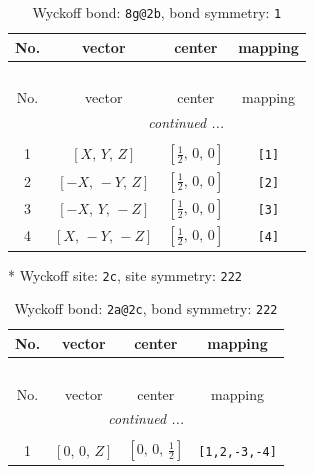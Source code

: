 \documentclass[fleqn,8pt]{jsarticle}
\begin{document}
\begin{longtable}{cccc}
\caption{Wyckoff bond: {\tt 8g@2b}, bond symmetry: {\tt 1}}
 \\
 \hline \hline
No. & vector & center & mapping \\ \hline \endfirsthead

\multicolumn{3}{l}{\tablename\ \thetable{}} \\
 \hline \hline
No. & vector & center & mapping \\ \hline \endhead

 \hline \hline
\multicolumn{3}{r}{\footnotesize\it continued ...} \\ \endfoot

 \hline \hline
\multicolumn{3}{r}{} \\ \endlastfoot

1 & $\left[ X,\, Y,\, Z \right]$ & $\left[ \frac{1}{2},\, 0,\, 0 \right]$ & {\tt [1]} \\ \hline
2 & $\left[ - X,\, - Y,\, Z \right]$ & $\left[ \frac{1}{2},\, 0,\, 0 \right]$ & {\tt [2]} \\ \hline
3 & $\left[ - X,\, Y,\, - Z \right]$ & $\left[ \frac{1}{2},\, 0,\, 0 \right]$ & {\tt [3]} \\ \hline
4 & $\left[ X,\, - Y,\, - Z \right]$ & $\left[ \frac{1}{2},\, 0,\, 0 \right]$ & {\tt [4]} \\
\end{longtable}
* Wyckoff site: {\tt 2c}, site symmetry: {\tt 222}
\renewcommand{\arraystretch}{1.2}
\begin{longtable}{cccc}
\caption{Wyckoff bond: {\tt 2a@2c}, bond symmetry: {\tt 222}}
 \\
 \hline \hline
No. & vector & center & mapping \\ \hline \endfirsthead

\multicolumn{3}{l}{\tablename\ \thetable{}} \\
 \hline \hline
No. & vector & center & mapping \\ \hline \endhead

 \hline \hline
\multicolumn{3}{r}{\footnotesize\it continued ...} \\ \endfoot

 \hline \hline
\multicolumn{3}{r}{} \\ \endlastfoot

1 & $\left[ 0,\, 0,\, Z \right]$ & $\left[ 0,\, 0,\, \frac{1}{2} \right]$ & {\tt [1,2,-3,-4]} \\
\end{longtable}
\renewcommand{\arraystretch}{1.2}
\end{document}
